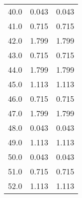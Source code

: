 \begin{table}
\begin{tabular}{ccc}
40.0 & 0.043 & 0.043 \\
41.0 & 0.715 & 0.715 \\
42.0 & 1.799 & 1.799 \\
43.0 & 0.715 & 0.715 \\
44.0 & 1.799 & 1.799 \\
45.0 & 1.113 & 1.113 \\
46.0 & 0.715 & 0.715 \\
47.0 & 1.799 & 1.799 \\
48.0 & 0.043 & 0.043 \\
49.0 & 1.113 & 1.113 \\
50.0 & 0.043 & 0.043 \\
51.0 & 0.715 & 0.715 \\
52.0 & 1.113 & 1.113 \\
\end{tabular}
\end{table}
